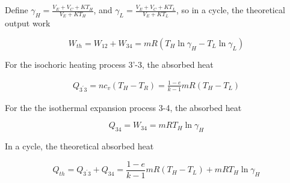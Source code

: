 Define $\gamma_H = \frac{V_E+V_C+KT_H}{V_E+KT_H}$, and $\gamma_L = \frac{V_E+V_C+KT_L}{V_E+KT_L}$, so in a cycle, the theoretical output work

\begin{equation}
	W_{th} = W_{12} + W_{34} = mR(T_H\ln\gamma_H - T_L\ln\gamma_L)
\end{equation}

For the isochoric heating process 3'-3, the absorbed heat

\begin{equation}
	\begin{split}
		Q_{3^{'}3} = nc_v(T_H-T_R)
		=\frac{1-e}{k-1}mR(T_H-T_L)
	\end{split}
\end{equation}


For the the isothermal expansion process 3-4, the absorbed heat

\begin{equation}
	Q_{34} = W_{34} = mRT_H\ln\gamma_H
\end{equation}

In a cycle, the theoretical absorbed heat

\begin{equation}
	Q_{th} = Q_{3^{'}3} + Q_{34} = \frac{1-e}{k-1}mR(T_H-T_L) + mRT_H\ln\gamma_H
\end{equation}


%
%

